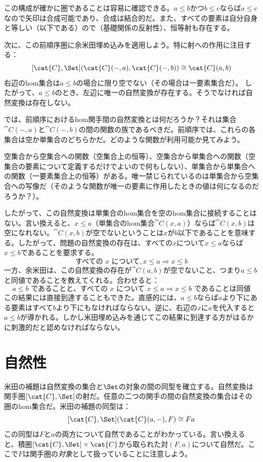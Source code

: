 この構成が確かに圏であることは容易に確認できる。$a \leqslant b$かつ$b \leqslant c$ならば$a \leqslant c$なので矢印は合成可能であり、合成は結合的だ。また、すべての要素は自分自身と等しい（以下である）ので（基礎関係の反射性）、恒等射も存在する。

次に、この前順序圏に余米田埋め込みを適用しよう。特に射への作用に注目する：
\[[\cat{C}, \Set](\cat{C}(-, a), \cat{C}(-, b)) \cong \cat{C}(a, b)\]
右辺のhom集合は$a \leqslant b$の場合に限り空でない（その場合は一要素集合だ）。
したがって、$a \leqslant b$のとき、左辺に唯一の自然変換が存在する。そうでなければ自然変換は存在しない。

では、前順序におけるhom関手間の自然変換とは何だろうか？それは集合$\cat{C}(-, a)$と$\cat{C}(-, b)$の間の関数の族であるべきだ。前順序では、これらの各集合は空か単集合のどちらかだ。どのような関数が利用可能か見てみよう。

空集合から空集合への関数（空集合上の恒等）、空集合から単集合への関数（空集合の要素について定義するだけでよいので何もしない）、単集合から単集合への関数（一要素集合上の恒等）がある。唯一禁じられているのは単集合から空集合への写像だ（そのような関数が唯一の要素に作用したときの値は何になるのだろうか？）。

したがって、この自然変換は単集合のhom集合を空のhom集合に接続することはない。言い換えると、$x \leqslant a$（単集合のhom集合$\cat{C}(x, a)$）ならば$\cat{C}(x, b)$は空になれない。$\cat{C}(x, b)$が空でないということは$x$が$b$以下であることを意味する。したがって、問題の自然変換の存在は、すべての$x$について$x \leqslant a$ならば$x \leqslant b$であることを要求する。
\[\text{すべての } x \text{ について}, x \leqslant a \Rightarrow x \leqslant b\]
一方、余米田は、この自然変換の存在が$\cat{C}(a, b)$が空でないこと、つまり$a \leqslant b$と同値であることを教えてくれる。合わせると：
\[a \leqslant b \text{ であることと、すべての } x \text{ について } x \leqslant a \Rightarrow x \leqslant b \text{ であることは同値}\]
この結果には直接到達することもできた。直感的には、$a \leqslant b$ならば$a$より下にある要素はすべて$b$より下にもなければならない。逆に、右辺の$x$に$a$を代入すると$a \leqslant b$が導かれる。しかし米田埋め込みを通じてこの結果に到達する方がはるかに刺激的だと認めなければならない。

\section{自然性}

米田の補題は自然変換の集合と$\Set$の対象の間の同型を確立する。自然変換は関手圏$[\cat{C}, \Set]$の射だ。任意の二つの関手の間の自然変換の集合はその圏のhom集合だ。米田の補題の同型は：
\[[\cat{C}, \Set](\cat{C}(a, -), F) \cong F a\]
この同型は$F$と$a$の両方について自然であることがわかっている。言い換えると、積圏$[\cat{C}, \Set] \times \cat{C}$から取られた対$(F, a)$について自然だ。ここで$F$は関手圏の\emph{対象}として扱っていることに注意しよう。

